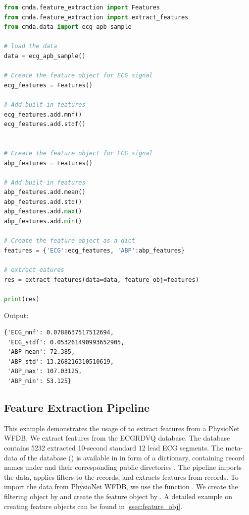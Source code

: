 \documentclass{article}
\begin{document}
\begin{lstlisting}[language=Python, caption=Multivariate feature extraction using one feature object]
from cmda.feature_extraction import Features
from cmda.feature_extraction import extract_features
from cmda.data import ecg_apb_sample

# load the data
data = ecg_apb_sample()

# Create the feature object for ECG signal
ecg_features = Features()

# Add built-in features
ecg_features.add.mnf()
ecg_features.add.stdf()


# Create the feature object for ECG signal
abp_features = Features()

# Add built-in features
abp_features.add.mean()
abp_features.add.std()
abp_features.add.max()
abp_features.add.min()

# Create the feature object as a dict
features = {'ECG':ecg_features, 'ABP':abp_features}

# extract eatures
res = extract_features(data=data, feature_obj=features)

print(res)
\end{lstlisting}

Output:
\begin{lstlisting}
{'ECG_mnf': 0.0788637517512694,
 'ECG_stdf': 0.053261490993652905,
 'ABP_mean': 72.385,
 'ABP_std': 13.268216310510619,
 'ABP_max': 107.03125,
 'ABP_min': 53.125}
\end{lstlisting}

\subsection{Feature Extraction Pipeline}
This example demonstrates the usage of  to extract features from a PhysioNet WFDB.
We extract features from the ECGRDVQ database. The database contains 5232 extracted 10-second standard 12 lead ECG segments. The meta-data of the database () is available in  in form of a dictionary, containing record names under  and  their corresponding public directories . The pipeline imports the data, applies filters to the records, and extracts features from records. To import the data from PhysioNet WFDB, we use the function . We create the filtering object by  and create the feature object by . A detailed example on creating feature objects can be found in \ref{ssec:feature_obj}.
\end{document}
